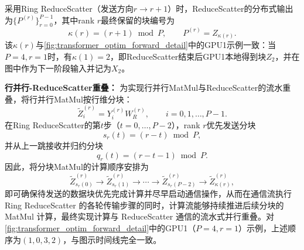 采用Ring ReduceScatter（发送方向$r\rightarrow r+1$）时，ReduceScatter的分布式输出为$\{P^{(r)}\}_{r=0}^{P-1}$，其中rank $r$最终保留的块编号为
\begin{equation}
\kappa(r)=(r+1)\bmod P,\qquad 
P^{(r)}=Z_{\kappa(r)}.
\end{equation}
该$\kappa(r)$与\autoref{fig:transformer_optim_forward_detail}中的GPU1示例一致：当$P=4,r=1$时，有$\kappa(1)=2$，即ReduceScatter结束后GPU1本地得到块$Z_2$，并在图中作为下一阶段输入并记为$X_2$。

\vspace{0.5em}
\noindent
\textbf{行并行-ReduceScatter重叠：}
为实现行并行MatMul与ReduceScatter的流水重叠，将行并行MatMul按行维分块：
\begin{equation}
\widetilde{Z}^{(r)}_i = Y^{(r)}_i W_R^{(r)},\qquad i=0,1,\ldots,P-1 .
\end{equation}
在Ring ReduceScatter的第$t$步（$t=0,\ldots,P-2$），rank $r$优先发送分块
\begin{equation}
s_r(t)=(r-t)\bmod P,
\end{equation}
并从上一跳接收并归约分块
\begin{equation}
q_r(t)=(r-t-1)\bmod P.
\end{equation}
因此，将分块MatMul的计算顺序安排为
\begin{equation}
\widetilde{Z}^{(r)}_{s_r(0)}\rightarrow \widetilde{Z}^{(r)}_{s_r(1)}\rightarrow \cdots \rightarrow \widetilde{Z}^{(r)}_{s_r(P-2)}\rightarrow \widetilde{Z}^{(r)}_{\kappa(r)},
\end{equation}
即可确保待发送的数据块优先完成计算并尽早启动通信操作，从而在通信流执行 Ring ReduceScatter 的各轮传输步骤的同时，计算流能够持续推进后续分块的 MatMul 计算，最终实现计算与 ReduceScatter 通信的流水式并行重叠。对\autoref{fig:transformer_optim_forward_detail}中的GPU1（$P=4,r=1$）示例，上述顺序为$(1,0,3,2)$，与图示时间线完全一致。

